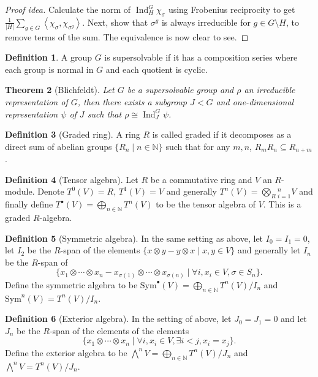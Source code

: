 \documentclass[paper=a4, fontsize=12pt]{scrartcl} %
\newtheorem{thm}{Theorem}
\theoremstyle{definition}
\newtheorem{defn}[thm]{Definition}
\theoremstyle{remark}
\newcommand{\N}{\mathbb{N}}
\DeclareMathOperator{\Ind}{Ind}
\newcommand{\inp}[2]{\left\langle #1, #2 \right\rangle}
\begin{document}
\begin{proof}[Proof idea]
	Calculate the norm of $\Ind_H^G\chi_{\sigma}$ using Frobenius reciprocity to get $\frac{1}{|H|}\sum_{g \in G} \inp{\chi_{\sigma}}{\chi_{\sigma^g}}$. Next, show that $\sigma^g$ is always irreducible for $g \in G \setminus H$, to remove terms of the sum. The equivalence is now clear to see.
\end{proof}
\begin{defn}
	A group $G$ is supersolvable if it has a composition series where each group is normal in $G$ and each quotient is cyclic.
\end{defn}
\begin{thm}[Blichfeldt]
	Let $G$ be a supersolvable group and $\rho$ an irreducible representation of $G$, then there exists a subgroup $J < G$ and one-dimensional representation $\psi$ of $J$ such that $\rho \cong \Ind_J^G\psi$.
\end{thm}
\begin{defn}[Graded ring]
	A ring $R$ is called graded if it decomposes as a direct sum of abelian groups $\{R_n \mid n \in \N\}$ such that for any $m,n$, $R_mR_n \subseteq R_{n+m}$.
\end{defn}
\begin{defn}[Tensor algebra]
	Let $R$ be a commutative ring and $V$ an $R$-module. Denote $T^0(V) = R$, $T^1(V) = V$ and generally $T^n(V) = \bigotimes_R{}_{i=1}^n V$ and finally define $T^{\bullet}(V) = \bigoplus_{n \in \N} T^n(V)$ to be the tensor algebra of $V$. This is a graded $R$-algebra.
\end{defn}
\begin{defn}[Symmetric algebra]
	In the same setting as above, let $I_0 = I_1 = 0$, let $I_2$ be the $R$-span of the elements $\{x \otimes y - y \otimes x \mid x,y \in V\}$ and generally let $I_n$ be the $R$-span of  
	$$\{x_1 \otimes \cdots \otimes x_n - x_{\sigma(1)} \otimes \cdots \otimes x_{\sigma(n)} \mid \forall i, x_i \in V, \sigma \in S_n\}.$$
	Define the symmetric algebra to be $\text{Sym}^{\bullet}(V) = \bigoplus_{n \in \N} T^n(V)/I_n$ and $\text{Sym}^n(V) = T^n(V)/I_n$.
\end{defn}
\begin{defn}[Exterior algebra]
	In the setting of above, let $J_0 = J_1 = 0$ and let $J_n$ be the $R$-span of the elements of the elements $$\{x_1 \otimes \cdots \otimes x_n\mid \forall i, x_i \in V, \exists i <j, x_i = x_j\}.$$
	Define the exterior algebra to be $\bigwedge^n V = \bigoplus_{n \in \N}T^n(V)/J_n$ and $\bigwedge^n V = T^n(V)/J_n$.
\end{defn}
\end{document}
